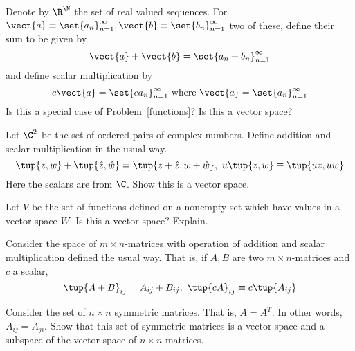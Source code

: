 \begin{enumialphparenastyle}
\begin{ex} Denote by $\R^{\N}$ the set of real valued sequences.
For $\vect{a}\equiv \set{a_{n}} _{n=1}^{\infty },\vect{b}\equiv
\set{b_{n}} _{n=1}^{\infty }$ two of these, define their sum to be
given by 
\begin{equation*}
\vect{a}+\vect{b} =  \set{a_{n}+b_{n}} _{n=1}^{\infty }
\end{equation*}
and define scalar multiplication by 
\begin{equation*}
c\vect{a}=\set{ca_{n}} _{n=1}^{\infty }\text{ where }\vect{a}
=\set{a_{n}} _{n=1}^{\infty }
\end{equation*}
Is this a special case of Problem~\ref{functions}? Is this a vector space?
\end{ex}

\begin{ex} Let $\C^{2}$ be the set of ordered pairs of complex numbers.
Define addition and scalar multiplication in the usual way.
\begin{equation*}
\tup{z,w} +\tup{\hat{z},\hat{w}} = \tup{z+\hat{z},w+
\hat{w}} ,\ u\tup{z,w} \equiv \tup{uz,uw}
\end{equation*}
Here the scalars are from $\C$. Show this is a vector space.
\end{ex}

\begin{ex} Let $V$ be the set of functions defined on a nonempty set which have
values in a vector space $W$. Is this a vector space? Explain.
\end{ex}

\begin{ex} Consider the space of $m\times n$-matrices with operation of addition
and scalar multiplication defined the usual way. That is, if $A,B$ are two $
m\times n$-matrices and $c$ a scalar, 
\begin{equation*}
\tup{A+B} _{ij}=A_{ij}+B_{ij},\ \tup{cA} _{ij}\equiv c\tup{
A_{ij}}
\end{equation*}
\end{ex}

\begin{ex} Consider the set of $n\times n$ symmetric matrices. That is, $A=A^{T}$.
In other words, $A_{ij}=A_{ji}$. Show that this set of symmetric matrices is
a vector space and a subspace of the vector space of $n\times n$-matrices.
\end{ex}


\end{enumialphparenastyle}
